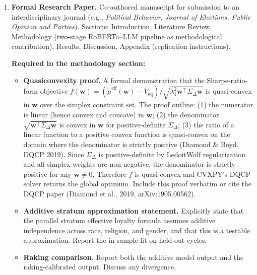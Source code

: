 \documentclass[11pt]{article}
\newcommand{\veq}{V_{\mathrm{eq}}}
\begin{document}
\begin{enumerate}[leftmargin=2em, itemsep=6pt]
  \item \textbf{Formal Research Paper.}
        Co-authored manuscript for submission to an interdisciplinary journal (e.g.,
        \textit{Political Behavior}, \textit{Journal of Elections, Public Opinion and Parties}).
        Sections: Introduction, Literature Review, Methodology (two-stage RoBERTa--LLM
        pipeline as methodological contribution), Results, Discussion, Appendix
        (replication instructions).

        \textbf{Required in the methodology section:}
        \begin{itemize}[leftmargin=1.6em, itemsep=2pt]
          \item \textbf{Quasiconvexity proof.} A formal demonstration that the
                Sharpe-ratio-form objective
                $f(\mathbf{w}) = (\tilde{\mu}^{\text{eff}}(\mathbf{w}) - \veq)
                / \sqrt{\lambda_1^2 \mathbf{w}^\top \Sigma_\Delta \mathbf{w}}$
                is quasi-convex in $\mathbf{w}$ over the simplex constraint set.
                The proof outline: (1) the numerator is linear (hence convex and
                concave) in $\mathbf{w}$; (2) the denominator $\sqrt{\mathbf{w}^\top
                \Sigma_\Delta \mathbf{w}}$ is convex in $\mathbf{w}$ for
                positive-definite $\Sigma_\Delta$; (3) the ratio of a linear
                function to a positive convex function is quasi-convex on the
                domain where the denominator is strictly positive (Diamond \&
                Boyd, DQCP 2019). Since $\Sigma_\Delta$ is positive-definite by
                LedoitWolf regularization and all simplex weights are non-negative,
                the denominator is strictly positive for any $\mathbf{w} \neq 0$.
                Therefore $f$ is quasi-convex and CVXPY's DQCP solver returns
                the global optimum. Include this proof verbatim or cite the DQCP
                paper (Diamond et al., 2019, arXiv:1905.00562).
          \item \textbf{Additive stratum approximation statement.} Explicitly state
                that the parallel stratum effective loyalty formula assumes additive
                independence across race, religion, and gender, and that this is a
                testable approximation. Report the in-sample fit on held-out cycles.
          \item \textbf{Raking comparison.} Report both the additive model output
                and the raking-calibrated output. Discuss any divergence.
        \end{itemize}


\end{enumerate}
\end{document}
